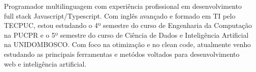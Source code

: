 
\begin{cvparagraph}Programador multilinguagem com experiência profissional em desenvolvimento full stack Javascript/Typescript. Com inglês avançado e formado em TI pelo TECPUC, estou estudando o 4º semestre do curso de Engenharia da Computação na PUCPR e o 5º semestre do curso de Ciência de Dados e Inteligência Artificial na UNIDOMBOSCO. Com foco na otimização e no clean code, atualmente venho estudando as principais ferramentas e metódos voltados para desenvolvimento web e inteligência artificial.
\end{cvparagraph}
